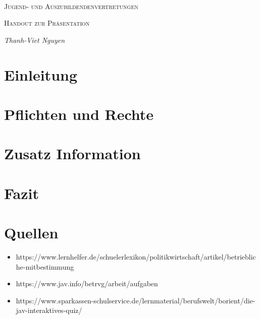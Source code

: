 \documentclass[
  a4paper,            %
  DIV=10,             %
  oneside,            %
  BCOR=5mm,           %
  parskip=half,       %
  numbers=noenddot    %
]{scrartcl}
\begin{document}
\begin{titlepage}
	\centering
	\text{}\vspace{3cm} \\
	{\scshape\LARGE Jugend- und Auszubildendenvertretungen \par}
	\vspace{1cm}
	{\scshape\Large 
		Handout zur Präsentation \par}
	\vspace{1.5cm}
	{\huge\bfseries \par}
	\vspace{2cm}
	{\Large\itshape     	
            Thanh-Viet Nguyen \\
            \par}
\vfill
\begingroup
{}		
        \textbf {} %
\endgroup
\end{titlepage}

    \tableofcontents
\clearpage


\section{Einleitung} \label{sec:intro}
    
\section{Pflichten und Rechte} 
    
\section{Zusatz Information} 


\newpage

\section{Fazit} \label{conclusion}
  
\section{Quellen}
\begin{itemize}
	\item 
	https://www.lernhelfer.de/schuelerlexikon/politikwirtschaft/artikel/betriebliche-mitbestimmung
	\item 
	https://www.jav.info/betrvg/arbeit/aufgaben
	\item
	https://www.sparkassen-schulservice.de/lernmaterial/berufswelt/borient/die-jav-interaktives-quiz/
\end{itemize}

%
%

\clearpage
\end{document}
